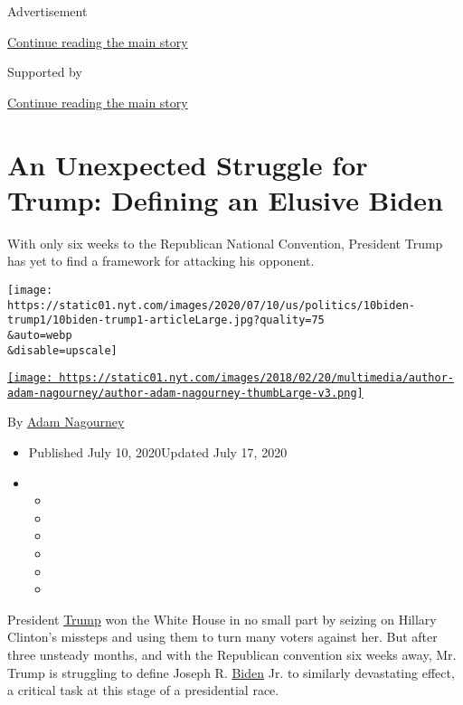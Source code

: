 Advertisement

\protect\hyperlink{after-top}{Continue reading the main story}

Supported by

\protect\hyperlink{after-sponsor}{Continue reading the main story}

\hypertarget{an-unexpected-struggle-for-trump-defining-an-elusive-biden}{%
\section{An Unexpected Struggle for Trump: Defining an Elusive
Biden}\label{an-unexpected-struggle-for-trump-defining-an-elusive-biden}}

With only six weeks to the Republican National Convention, President
Trump has yet to find a framework for attacking his opponent.

\texttt{[image: https://static01.nyt.com/images/2020/07/10/us/politics/10biden-trump1/10biden-trump1-articleLarge.jpg?quality=75\\\&auto=webp\\\&disable=upscale]}

\href{https://www.nytimes.com/by/adam-nagourney}{\texttt{[image: https://static01.nyt.com/images/2018/02/20/multimedia/author-adam-nagourney/author-adam-nagourney-thumbLarge-v3.png]}}

By \href{https://www.nytimes.com/by/adam-nagourney}{Adam Nagourney}

\begin{itemize}
\item
  Published July 10, 2020Updated July 17, 2020
\item
  \begin{itemize}
  \item
  \item
  \item
  \item
  \item
  \item
  \end{itemize}
\end{itemize}

President
\href{https://www.nytimes.com/2020/07/17/us/trump-biden-2020-election.html}{Trump}
won the White House in no small part by seizing on Hillary Clinton's
missteps and using them to turn many voters against her. But after three
unsteady months, and with the Republican convention six weeks away, Mr.
Trump is struggling to define Joseph R.
\href{https://www.nytimes.com/2020/07/17/us/trump-biden-2020-election.html}{Biden}
Jr. to similarly devastating effect, a critical task at this stage of a
presidential race.

